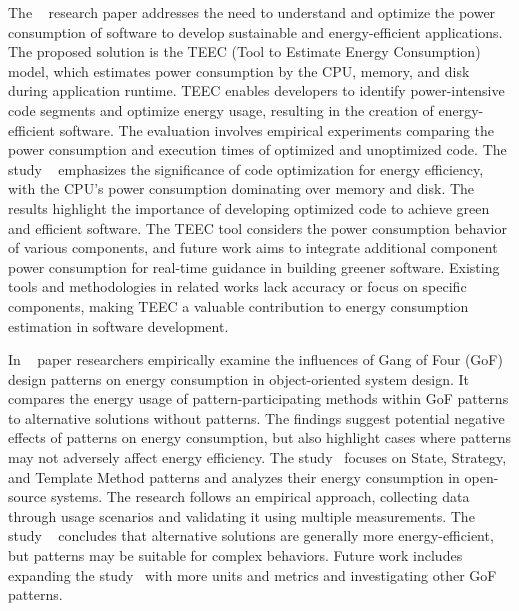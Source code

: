  
The ~\cite{DBLP:journals/ijebm/AcarAGG16} research paper addresses the need to understand and optimize the power consumption of software to develop sustainable and energy-efficient applications.  The proposed solution is the TEEC (Tool to Estimate Energy Consumption) model, which estimates power consumption by the CPU, memory, and disk during application runtime. TEEC enables developers to identify power-intensive code segments and optimize energy usage, resulting in the creation of energy-efficient software. The evaluation involves empirical experiments comparing the power consumption and execution times of optimized and unoptimized code. The study ~\cite{DBLP:journals/ijebm/AcarAGG16} emphasizes the significance of code optimization for energy efficiency, with the CPU's power consumption dominating over memory and disk. The results highlight the importance of developing optimized code to achieve green and efficient software. The TEEC tool considers the power consumption behavior of various components, and future work aims to integrate additional component power consumption for real-time guidance in building greener software. Existing tools and methodologies in related works lack accuracy or focus on specific components, making TEEC a valuable contribution to energy consumption estimation in software development.\par
 

In ~\cite{DBLP:journals/smr/FeitosaAAAN17} paper researchers empirically examine  the influences of Gang of Four (GoF) design patterns on energy consumption in object-oriented system design. It compares the energy usage of pattern-participating methods within GoF patterns to alternative solutions without patterns. The findings suggest potential negative effects of patterns on energy consumption, but also highlight cases where patterns may not adversely affect energy efficiency. The study~\cite{DBLP:journals/smr/FeitosaAAAN17} focuses on State, Strategy, and Template Method patterns and analyzes their energy consumption in open-source systems. The research follows an empirical approach, collecting data through usage scenarios and validating it using multiple measurements. The study ~\cite{DBLP:journals/smr/FeitosaAAAN17} concludes that alternative solutions are generally more energy-efficient, but patterns may be suitable for complex behaviors. Future work includes expanding the study~\cite{DBLP:journals/smr/FeitosaAAAN17} with more units and metrics and investigating other GoF patterns.\par

